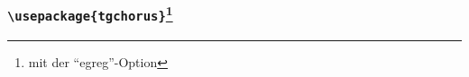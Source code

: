 \documentclass[12pt,ngerman]{beamer}
\begin{document}
\begin{frame}
\frametitle{\texttt{\textbackslash usepackage\{tgchorus\}}\footnote{mit der \enquote{egreg}-Option}}

\vspace*{-0.75cm}\begin{center}
\end{center}

\end{frame}
\end{document}
